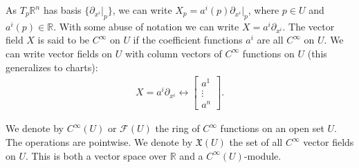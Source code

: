 \documentclass[a4paper]{article}
\newcommand{\R}{\mathbb{R}}
\begin{document}
As $T_p\R^n$ has basis $\{\partial_{x^i}|_p\}$, we can write $X_p = a^i(p)\partial_{x^i}|_p$, where $p \in U$ and $a^i(p) \in \R$. With some abuse of notation we can write $X = a^i \partial_{x^i}$. The vector field $X$ is said to be $C^\infty$ on $U$ if the coefficient functions $a^i$ are all $C^\infty$ on $U$. We can write vector fields on $U$ with column vectors of $C^\infty$ functions on $U$ (this generalizes to charts):
\begin{align}
    X = a^i\partial_{x^i} \longleftrightarrow \begin{bmatrix} a^1 \\ \vdots \\ a^n \end{bmatrix}.
\end{align}

We denote by $C^\infty(U)$ or $\mathcal{F}(U)$ the ring of $C^\infty$ functions on an open set $U$. The operations are pointwise. We denote by $\mathfrak{X}(U)$ the set of all $C^\infty$ vector fields on $U$. This is both a vector space over $\R$ and a $C^\infty(U)$-module.
\end{document}
